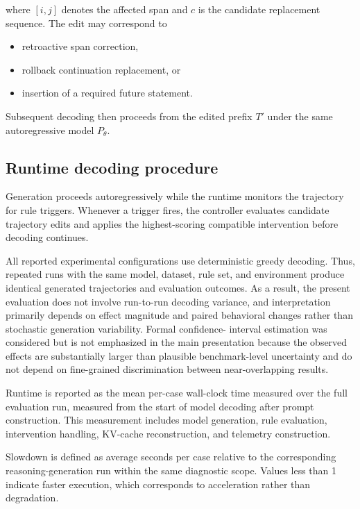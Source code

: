 \documentclass[twocolumn]{article}
\begin{document}
where $[i,j]$ denotes the affected span and $c$ is the candidate replacement
sequence. The edit may correspond to

\begin{itemize}
  \item retroactive span correction,
  \item rollback continuation replacement, or
  \item insertion of a required future statement.
\end{itemize}

Subsequent decoding then proceeds from the edited prefix $T'$ under the same
autoregressive model $P_\theta$.

\subsection{Runtime decoding procedure}

Generation proceeds autoregressively while the runtime monitors the trajectory
for rule triggers. Whenever a trigger fires, the controller evaluates candidate
trajectory edits and applies the highest-scoring compatible intervention before
decoding continues.

All reported experimental configurations use deterministic greedy decoding.
Thus, repeated runs with the same model, dataset, rule set, and environment
produce identical generated trajectories and evaluation outcomes. As a result,
the present evaluation does not involve run-to-run decoding variance, and
interpretation primarily depends on effect magnitude and paired behavioral
changes rather than stochastic generation variability. Formal confidence-
interval estimation was considered but is not emphasized in the main
presentation because the observed effects are substantially larger than
plausible benchmark-level uncertainty and do not depend on fine-grained
discrimination between near-overlapping results.

Runtime is reported as the mean per-case wall-clock time measured over
the full evaluation run, measured from the start of model
decoding after prompt construction. This measurement includes model generation,
rule evaluation, intervention handling, KV-cache reconstruction, and telemetry
construction.

Slowdown is defined as average seconds per case relative to the corresponding
reasoning-generation run within the same diagnostic scope. Values less than
1 indicate faster execution, which corresponds to acceleration rather than
degradation.
\end{document}

